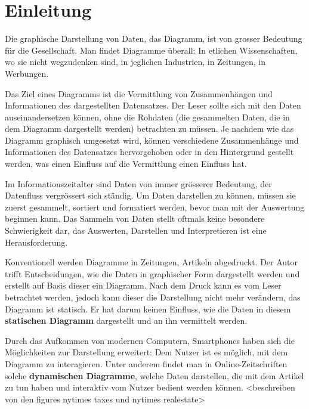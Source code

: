 \chapter{Einleitung}
Die graphische Darstellung von Daten, das Diagramm, ist von grosser Bedeutung für die Gesellschaft. Man findet Diagramme überall: In etlichen Wissenschaften, wo sie nicht wegzudenken sind, in jeglichen Industrien, in Zeitungen, in Werbungen.

Das Ziel eines Diagramms ist die Vermittlung von Zusammenhängen und Informationen des dargestellten Datensatzes. Der Leser sollte sich mit den Daten auseinandersetzen können, ohne die Rohdaten (die gesammelten Daten, die in dem Diagramm dargestellt werden) betrachten zu müssen. Je nachdem wie das Diagramm graphisch umgesetzt wird, können verschiedene Zusammenhänge und Informationen des Datensatzes hervorgehoben oder in den Hintergrund gestellt werden, was einen Einfluss auf die Vermittlung einen Einfluss hat.

Im Informationszeitalter sind Daten von immer grösserer Bedeutung, der Datenfluss vergrössert sich ständig. Um Daten darstellen zu können, müssen sie zuerst gesammelt, sortiert und formatiert werden, bevor man mit der Auswertung beginnen kann. Das Sammeln von Daten stellt oftmals keine besondere Schwierigkeit dar, das Auswerten, Darstellen und Interpretieren ist eine Herausforderung.

Konventionell werden Diagramme in Zeitungen, Artikeln abgedruckt. Der Autor trifft Entscheidungen, wie die Daten in graphischer Form dargestellt werden und erstellt auf Basis dieser ein Diagramm. Nach dem Druck kann es vom Leser betrachtet werden, jedoch kann dieser die Darstellung nicht mehr verändern, das Diagramm ist statisch. Er hat darum keinen Einfluss, wie die Daten in diesem \textbf{statischen Diagramm} dargestellt und an ihn vermittelt werden.

Durch das Aufkommen von modernen Computern, Smartphones haben sich die Möglichkeiten zur Darstellung erweitert: Dem Nutzer ist es möglich, mit dem Diagramm zu interagieren. Unter anderem findet man in Online-Zeitschriften solche \textbf{dynamischen Diagramme}, welche Daten darstellen, die mit dem Artikel zu tun haben und interaktiv vom Nutzer bedient werden können. <beschreiben von den figures nytimes taxes und nytimes realestate>

